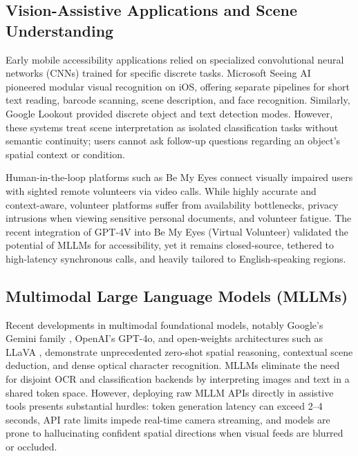 \documentclass[10pt,a4paper]{article}
\begin{document}
\subsection{Vision-Assistive Applications and Scene Understanding}
Early mobile accessibility applications relied on specialized convolutional neural networks (CNNs) trained for specific discrete tasks. Microsoft Seeing AI \citep{microsoftSeeingAI} pioneered modular visual recognition on iOS, offering separate pipelines for short text reading, barcode scanning, scene description, and face recognition. Similarly, Google Lookout \citep{lookout2020} provided discrete object and text detection modes. However, these systems treat scene interpretation as isolated classification tasks without semantic continuity; users cannot ask follow-up questions regarding an object's spatial context or condition. 

Human-in-the-loop platforms such as Be My Eyes \citep{bemyeyes2021} connect visually impaired users with sighted remote volunteers via video calls. While highly accurate and context-aware, volunteer platforms suffer from availability bottlenecks, privacy intrusions when viewing sensitive personal documents, and volunteer fatigue. The recent integration of GPT-4V into Be My Eyes (Virtual Volunteer) validated the potential of MLLMs for accessibility, yet it remains closed-source, tethered to high-latency synchronous calls, and heavily tailored to English-speaking regions.

\subsection{Multimodal Large Language Models (MLLMs)}
Recent developments in multimodal foundational models, notably Google's Gemini family \citep{team2023gemini}, OpenAI's GPT-4o, and open-weights architectures such as LLaVA \citep{liu2024llava}, demonstrate unprecedented zero-shot spatial reasoning, contextual scene deduction, and dense optical character recognition. MLLMs eliminate the need for disjoint OCR and classification backends by interpreting images and text in a shared token space. However, deploying raw MLLM APIs directly in assistive tools presents substantial hurdles: token generation latency can exceed 2--4 seconds, API rate limits impede real-time camera streaming, and models are prone to hallucinating confident spatial directions when visual feeds are blurred or occluded.
\end{document}
